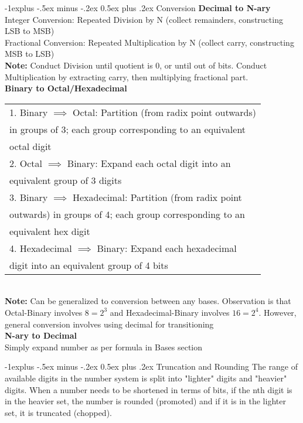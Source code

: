 \documentclass[10pt,landscape]{article}
\makeatletter
\renewcommand{\subsection}{\@startsection{subsection}{2}{0mm}%
                                {-1explus -.5ex minus -.2ex}%
                                {0.5ex plus .2ex}%
                                {\normalfont\normalsize\bfseries}}
\makeatother
\begin{document}
\begin{multicols}{3}
\subsection{Conversion} 
\textbf{Decimal to N-ary} \\ 
Integer Conversion: Repeated Division by N (collect remainders, constructing LSB to MSB) \\ 
Fractional Conversion: Repeated Multiplication by N (collect carry, constructing MSB to LSB) \\ 
\textbf{Note:} Conduct Division until quotient is 0, or until out of bits. Conduct Multiplication by extracting carry, then multiplying fractional part. \\ 
\textbf{Binary to Octal/Hexadecimal} \\ 
\begin{tabular}{l} 
1. Binary $\implies$ Octal: Partition (from radix point outwards) \\ in groups of 3; each group corresponding to an equivalent \\ octal digit \\ 
2. Octal $\implies$ Binary: Expand each octal digit into an \\ equivalent group of 3 digits \\ 
3. Binary $\implies$ Hexadecimal: Partition (from radix point \\ outwards) in groups of 4; each group corresponding to an \\ equivalent hex digit \\ 
4. Hexadecimal $\implies$ Binary: Expand each hexadecimal \\ digit into an equivalent group of 4 bits \\ 
\end{tabular} \\ 
\textbf{Note:} Can be generalized to conversion between any bases. Observation is that Octal-Binary involves $8 = 2^3$ and Hexadecimal-Binary involves $16 = 2^4$. However, general conversion involves using decimal for transitioning \\ 
\textbf{N-ary to Decimal} \\ 
Simply expand number as per formula in Bases section

\subsection{Truncation and Rounding} 
The range of available digits in the number system is split into "lighter" digits and "heavier" digits. When a number needs to be shortened in terms of bits, if the nth digit is in the heavier set, the number is rounded (promoted) and if it is in the lighter set, it is truncated (chopped). 


\end{multicols}
\end{document}

